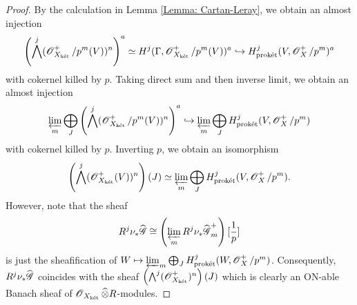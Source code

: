 \begin{proof}
By the calculation in Lemma \ref{Lemma: Cartan-Leray}, we obtain an almost injection
$$\left(\bigwedge^j (\operatorname{\mathscr{O}}^+_{X_{\operatorname{\textrm{k\'{e}t}}}}/p^m(V))^n\right)^a \simeq H^j(\Gamma, \operatorname{\mathscr{O}}^+_{X_{\operatorname{\textrm{k\'{e}t}}}}/p^m(V))^a\hookrightarrow H^j_{\operatorname{\textrm{prok\'{e}t}}}(V, \operatorname{\mathscr{O}}^+_X/p^m)^a$$
with cokernel killed by $p$. Taking direct sum and then inverse limit, we obtain an almost injection
$$
\varprojlim_m \bigoplus_J \left(\bigwedge^j (\operatorname{\mathscr{O}}^+_{X_{\operatorname{\textrm{k\'{e}t}}}}/p^m(V))^n\right)^a \hookrightarrow \varprojlim_m \bigoplus_J H^j_{\operatorname{\textrm{prok\'{e}t}}}(V, \operatorname{\mathscr{O}}^+_X/p^m)
$$
with cokernel killed by $p$. Inverting $p$, we obtain an isomorphism
$$
\left(\bigwedge^j (\operatorname{\mathscr{O}}^+_{X_{\operatorname{\textrm{k\'{e}t}}}}(V))^n\right)(J)\simeq \varprojlim_m \bigoplus_J H^j_{\operatorname{\textrm{prok\'{e}t}}}(V, \operatorname{\mathscr{O}}^+_X/p^m).
$$
However, note that the sheaf $$R^j\nu_*\widehat{\operatorname{\mathscr{G}}}\cong \left(\varprojlim_m R^j \nu_*\widehat{\operatorname{\mathscr{G}}}^+_m\right)[\frac{1}{p}]$$
is just the sheafification of $W\mapsto \varprojlim_m \bigoplus_J H^j_{\operatorname{\textrm{prok\'{e}t}}}(W, \operatorname{\mathscr{O}}^+_X/p^m)$. Consequently, $R^j\nu_*\widehat{\operatorname{\mathscr{G}}}$ coincides with the sheaf $\left(\bigwedge^j (\operatorname{\mathscr{O}}^+_{X_{\operatorname{\textrm{k\'{e}t}}}})^n\right)(J)$ which is clearly an ON-able Banach sheaf of $\operatorname{\mathscr{O}}_{X_{\operatorname{\textrm{k\'{e}t}}}}\widehat{\otimes} R$-modules.
\end{proof}

